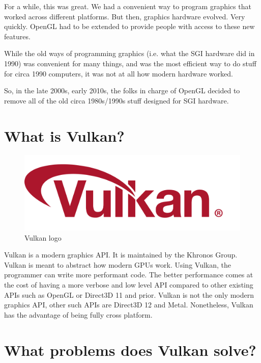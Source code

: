 For a while, this was great. We had a convenient way to program graphics
that worked across different platforms. But then, graphics hardware evolved.
Very quickly. OpenGL had to be extended to provide people with access to
these new features.

While the old ways of programming graphics (i.e. what the SGI
hardware did in 1990) was convenient for many things, and was the most efficient
way to do stuff for circa 1990 computers, it was not at all how modern hardware
worked.

So, in the late 2000s, early 2010s, the folks in charge of OpenGL decided to
remove all of the old circa 1980s/1990s stuff designed for SGI hardware.

\section{What is Vulkan?}

\begin{figure}
    \begin{center}
        \includegraphics[scale=0.10]{images/ChVulkan/VulkanLogo.png}
    \end{center}
    \caption{Vulkan logo}
    \label{fig:VulkanLogo}
\end{figure}

Vulkan is a modern graphics API. It is maintained by the Khronos Group.
Vulkan is meant to abstract how modern GPUs work.
Using Vulkan, the programmer can write more performant code.
The better performance comes at the cost of having a more verbose and low level API compared to
other existing APIs such as OpenGL or Direct3D 11 and prior.
Vulkan is not the only modern graphics API, other such APIs are Direct3D 12 and Metal.
Nonetheless, Vulkan has the advantage of being fully cross platform.

\section{What problems does Vulkan solve?}

